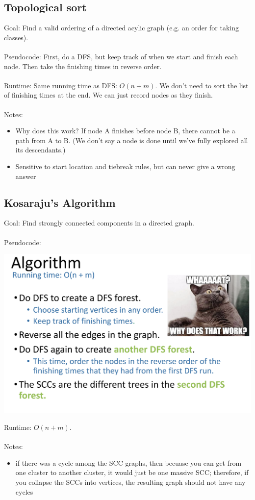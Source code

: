 \documentclass[12pt]{article}
\begin{document}
\subsection*{Topological sort}
Goal: Find a valid ordering of a directed acylic graph (e.g. an order for taking classes). 
\\\\
Pseudocode: First, do a DFS, but keep track of when we start
and finish each node. Then take the finishing times in reverse order.
\\\\
Runtime: Same running time as DFS: $O(n + m)$. We don't need to sort the list of finishing times at the end. We can just record nodes as they finish.
\\\\
Notes:
\begin{itemize}
    \item Why does this work? If node A finishes before node B, there cannot be a path from A to B. (We don't say a node is done until we've fully explored all its descendants.)
    \item Sensitive to start location and tiebreak rules, but can never give a wrong answer 
\end{itemize}

\subsection*{Kosaraju's Algorithm}
Goal: Find strongly connected components in a directed graph.
\\\\
Pseudocode: 
\begin{center}
\includegraphics[scale=0.3]{kosaraju.png} 
\end{center}
Runtime: $O(n + m)$.
\\\\
Notes:
\begin{itemize}
    \item if there was a cycle among the SCC graphs, then becuase you can get from one cluster to another cluster, it would just be one massive SCC; therefore, if you collapse the SCCs into vertices, the resulting graph should not have any cycles 
    
\end{itemize}
\end{document}
